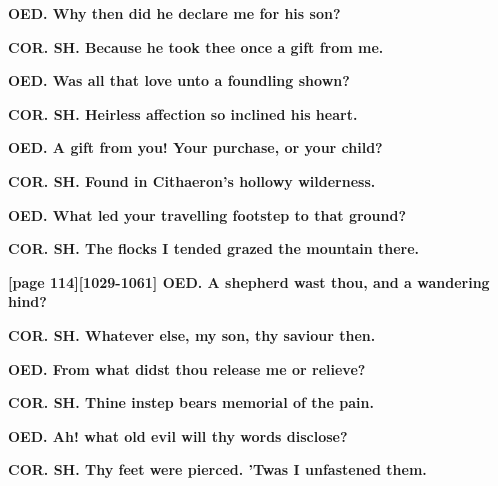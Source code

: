 \documentclass[11pt,letter]{book}
\begin{document}
\par \textbf{OED. Why then did he declare me for his son?}
\par 

\par \textbf{COR. SH. Because he took thee once a gift from me.}
\par 

\par \textbf{OED. Was all that love unto a foundling shown?}
\par 

\par \textbf{COR. SH. Heirless affection so inclined his heart.}
\par 

\par \textbf{OED. A gift from you! Your purchase, or your child?}
\par 

\par \textbf{COR. SH. Found in Cithaeron’s hollowy wilderness.}
\par 

\par \textbf{OED. What led your travelling footstep to that ground?}
\par 

\par \textbf{COR. SH. The flocks I tended grazed the mountain there.}
\par 

\par \textbf{[page 114][1029-1061] OED. A shepherd wast thou, and a wandering hind?}
\par 

\par \textbf{COR. SH. Whatever else, my son, thy saviour then.}
\par 

\par \textbf{OED. From what didst thou release me or relieve?}
\par 

\par \textbf{COR. SH. Thine instep bears memorial of the pain.}
\par 

\par \textbf{OED. Ah! what old evil will thy words disclose?}
\par 

\par \textbf{COR. SH. Thy feet were pierced. ’Twas I unfastened them.}
\par 
\end{document}
